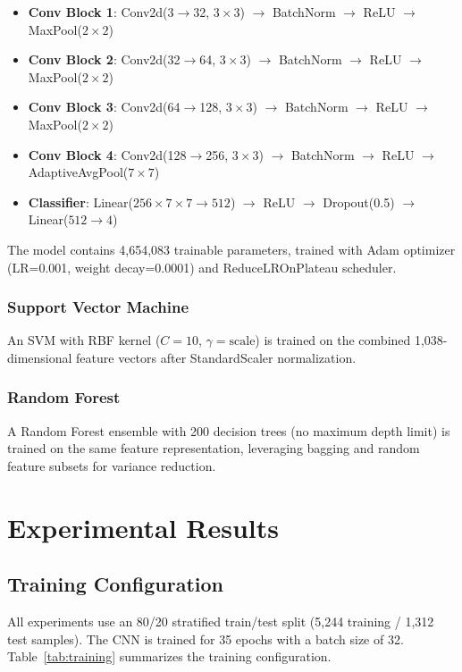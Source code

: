 \documentclass[conference]{IEEEtran}
\begin{document}
\begin{itemize}
    \item \textbf{Conv Block 1}: Conv2d(3$\rightarrow$32, $3\times3$) $\rightarrow$ BatchNorm $\rightarrow$ ReLU $\rightarrow$ MaxPool($2\times2$)
    \item \textbf{Conv Block 2}: Conv2d(32$\rightarrow$64, $3\times3$) $\rightarrow$ BatchNorm $\rightarrow$ ReLU $\rightarrow$ MaxPool($2\times2$)
    \item \textbf{Conv Block 3}: Conv2d(64$\rightarrow$128, $3\times3$) $\rightarrow$ BatchNorm $\rightarrow$ ReLU $\rightarrow$ MaxPool($2\times2$)
    \item \textbf{Conv Block 4}: Conv2d(128$\rightarrow$256, $3\times3$) $\rightarrow$ BatchNorm $\rightarrow$ ReLU $\rightarrow$ AdaptiveAvgPool($7\times7$)
    \item \textbf{Classifier}: Linear($256 \times 7 \times 7 \rightarrow 512$) $\rightarrow$ ReLU $\rightarrow$ Dropout(0.5) $\rightarrow$ Linear($512 \rightarrow 4$)
\end{itemize}

The model contains 4,654,083 trainable parameters, trained with Adam optimizer (LR=0.001, weight decay=0.0001) and ReduceLROnPlateau scheduler.

\subsubsection{Support Vector Machine}
An SVM with RBF kernel ($C=10$, $\gamma=\text{scale}$) is trained on the combined 1,038-dimensional feature vectors after StandardScaler normalization.

\subsubsection{Random Forest}
A Random Forest ensemble with 200 decision trees (no maximum depth limit) is trained on the same feature representation, leveraging bagging and random feature subsets for variance reduction.


\section{Experimental Results}
\label{sec:experiments}

\subsection{Training Configuration}
All experiments use an 80/20 stratified train/test split (5,244 training / 1,312 test samples). The CNN is trained for 35 epochs with a batch size of 32. Table~\ref{tab:training} summarizes the training configuration.
\end{document}
